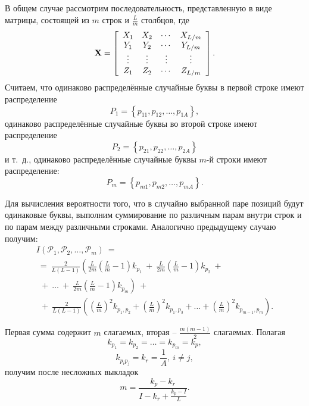 В общем случае рассмотрим последовательность, представленную в виде матрицы, состоящей из $m$ строк и $\frac{L}{m}$ столбцов, где
\[
{\mathbf X} = \left[ {\begin{array}{*{20}c}
   {X_1 } & {X_2 } &  \cdots  & {X_{L/m} }  \\
   {Y_1 } & {Y_2 } &  \cdots  & {Y_{L/m} }  \\
    \vdots  &  \vdots  &  \vdots  &  \vdots   \\
   {Z_1 } & {Z_2 } &  \cdots  & {Z_{L/m} }  \\
\end{array}} \right].
\]
Считаем, что одинаково распределённые случайные буквы в первой строке имеют распределение
    \[ P_1  = \left\{ {p_{11} ,p_{12} , \ldots , p_{1A} } \right\}, \]
одинаково распределённые случайные буквы во второй строке имеют распределение
    \[ P_2  = \left\{ {p_{21} ,p_{22} , \ldots , p_{2A} } \right\} \]
и т.~д., одинаково распределённые случайные буквы $m$-й строки имеют распределение:
    \[ P_m  = \left\{ {p_{m1},p_{m2} , \ldots , p_{mA} } \right\}. \]

Для вычисления вероятности того, что в случайно выбранной паре позиций будут одинаковые буквы, выполним суммирование по различным парам внутри строк и по парам между различными строками. Аналогично предыдущему случаю получим:
\[\begin{array}{l}
	I(\mathcal{P}_1, \mathcal{P}_2, \ldots, \mathcal{P}_m ) ~= \\
	~=~ \frac{2}{L(L - 1)} \left( \frac{L}{2m} \left( \frac{L}{m} - 1 \right) k_{p_1} ~+~ \frac{L}{2m} \left( \frac{L}{m} - 1 \right) k_{p_2} ~+ \right. \\
	~~+~ \dots ~+~ \left. \frac{L}{2m} \left( \frac{L}{m} - 1 \right) k_{p_m} \right) ~+ \\
	~~+~ \frac{2}{L(L - 1)} \left( \left( \frac{L}{m} \right)^2 k_{p_1, p_2} + \left( \frac{L}{m} \right)^2 k_{p_1, p_3} + \dots + \left( \frac{L}{m} \right)^2 k_{p_{m - 1}, p_m } \right).
\end{array}\]

Первая сумма содержит $m$ слагаемых, вторая -- $ \frac{m(m-1)}{2}$ слагаемых. Полагая
    \[ k_{p_1} = k_{p_2} = \dots = k_{p_m} = k_p, \]
    \[ k_{p_i p_j } = k_r = \frac{1}{A}, ~ i \ne j, \]
получим после несложных выкладок
    \[ m = \frac{k_p  - k_r}{I - k_r  + \frac{k_p  - I}{L}}. \]
